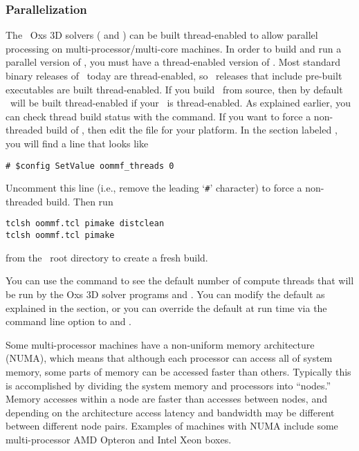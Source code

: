 \subsubsection{Parallelization}%
\label{sec:parallel}
The \OOMMF\ Oxs 3D solvers ( and ) can be built
thread-enabled to allow parallel processing on
multi-processor/multi-core machines.  In order to build and run a
parallel version of \OOMMF, you must have a thread-enabled version of
\Tcl.  Most standard binary releases of \Tcl\ today are thread-enabled,
so \OOMMF\ releases that include pre-built executables are built
thread-enabled.  If you build \OOMMF\ from source, then by default
\OOMMF\ will be built thread-enabled if your \Tcl\ is thread-enabled.
As explained earlier, you can check thread build status with the
 command.  If you want to force a
non-threaded build of \OOMMF, then edit the  file
for your platform.  In the section labeled , you
will find a line that looks like
\begin{verbatim}
# $config SetValue oommf_threads 0
\end{verbatim}
Uncomment this line (i.e., remove the leading `\verb+#+' character) to
force a non-threaded build.  Then run
\begin{verbatim}
tclsh oommf.tcl pimake distclean
tclsh oommf.tcl pimake
\end{verbatim}
from the \OOMMF\ root directory to create a fresh build.

You can use the  command to see the
default number of compute threads that will be run by the Oxs 3D
solver programs  and .  You can modify the default
as explained in the  section, or you can override 
the default at run time via the command line option  to
 and .

Some multi-processor machines have a non-uniform memory
architecture (NUMA), which means that although each processor can access
all of system memory, some parts of memory can be accessed faster than
others.  Typically this is accomplished by dividing the system memory
and processors into ``nodes.''  Memory accesses within a node are faster
than accesses between nodes, and depending on the architecture access
latency and bandwidth may be different between different node pairs.
Examples of machines with NUMA include some multi-processor AMD Opteron
and Intel Xeon boxes.

